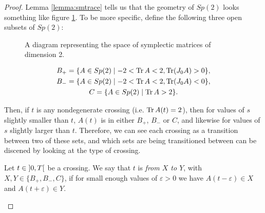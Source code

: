 \begin{proof}
Lemma \ref{lemma:smtrace} tells us that the geometry of $Sp(2)$ looks something like figure \ref{fig:smgeom}. To be more specific, define the following three open subsets of $Sp(2)$:

\begin{figure}
\centering
{}
\caption{A diagram representing the space of symplectic matrices of dimension 2.}\label{fig:smgeom}
\end{figure}

\begin{equation}
\begin{gathered}
B_+ = \{A \in Sp(2) \mid  -2 < \operatorname{Tr} A < 2, \operatorname{Tr}(J_0 A) > 0\},\\
B_- = \{A \in Sp(2) \mid -2 < \operatorname{Tr} A < 2, \operatorname{Tr}(J_0 A) < 0\},\\
C = \{A \in Sp(2) \mid \operatorname{Tr} A > 2\}.
\end{gathered}
\end{equation}

Then, if $t$ is any nondegenerate crossing (i.e. $\operatorname{Tr} A(t) = 2$), then for values of $s$ slightly smaller than $t$, $A(t)$ is in either $B_+$, $B_-$ or $C$, and likewise for values of $s$ slightly larger than $t$. Therefore, we can see each crossing as a transition between two of these sets, and which sets are being transitioned between can be discened by looking at the type of crossing.

\begin{definition}
Let $t \in \ointerval0T$ be a crossing. We say that $t$ is \emph{from $X$ to $Y$}, with $X, Y \in \{B_+, B_-, C\}$, if for small enough values of $\varepsilon > 0$ we have $A(t-\varepsilon) \in X$ and $A(t+\varepsilon) \in Y$.


\end{definition}
\end{proof}
